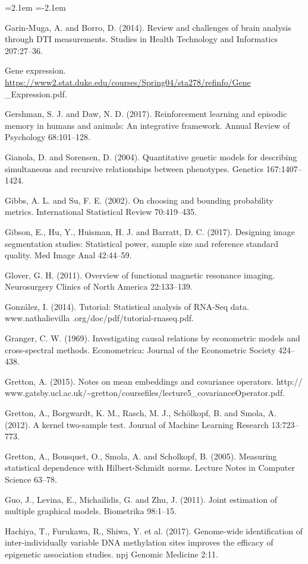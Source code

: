 \begin{list}{}{\leftmargin=2.1em  
  \itemindent=-2.1em \parsep=0pt \itemsep=2pt \topsep=0pt}
\item Garin-Muga, A. and Borro, D. (2014). Review and challenges of brain analysis through DTI measurements. Studies in Health Technology and Informatics 207:27--36.
\item Gene expression. \url{https://www2.stat.duke.edu/courses/Spring04/sta278/refinfo/Gene} \_Expression.pdf.
\item Gershman, S. J. and Daw, N. D. (2017). Reinforcement learning and episodic memory in humans and animals: An integrative framework. Annual Review of Psychology 68:101--128.
\item Gianola, D. and Sorensen, D. (2004). Quantitative genetic models for describing simultaneous and recursive relationships between phenotypes. Genetics 167:1407--1424.
\item Gibbs, A. L. and Su, F. E. (2002). On choosing and bounding probability metrics. International Statistical Review 70:419--435.
\item Gibson, E., Hu, Y., Huisman, H. J. and Barratt, D. C. (2017). Designing image segmentation studies: Statistical power, sample size and reference standard quality. Med Image Anal 42:44--59.
\item Glover, G. H. (2011). Overview of functional magnetic resonance imaging. Neurosurgery Clinics of North America 22:133--139.
\item González, I. (2014). Tutorial: Statistical analysis of RNA-Seq data. www.nathalievilla .org/doc/pdf/tutorial-rnaseq.pdf.
\item Granger, C. W. (1969). Investigating causal relations by econometric models and cross-spectral methods. Econometrica: Journal of the Econometric Society 424--438.
\item Gretton, A. (2015). Notes on mean embeddings and covariance operators. http:// www.gatsby.ucl.ac.uk/\textasciitilde{}gretton/coursefiles/lecture5\_covarianceOperator.pdf.
\item Gretton, A., Borgwardt, K. M., Rasch, M. J., Schölkopf, B. and Smola, A. (2012). A kernel two-sample test. Journal of Machine Learning Research 13:723--773.
\item Gretton, A., Bousquet, O., Smola, A. and Scholkopf, B. (2005). Measuring statistical dependence with Hilbert-Schmidt norms. Lecture Notes in Computer Science 63--78.
\item Guo, J., Levina, E., Michailidis, G. and Zhu, J. (2011). Joint estimation of multiple graphical models. Biometrika 98:1--15.
\item Hachiya, T., Furukawa, R., Shiwa, Y. et al. (2017). Genome-wide identification of inter-individually variable DNA methylation sites improves the efficacy of epigenetic association studies. npj Genomic Medicine 2:11.

\end{list}
